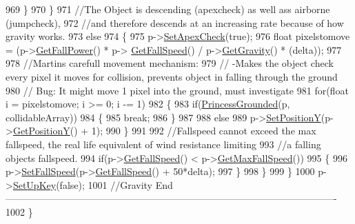 \begin{DoxyCode}
969             \}
970         \}
971             \textcolor{comment}{//The Object is descending (apexcheck) as well ass airborne (jumpcheck),}
972             \textcolor{comment}{//and therefore descends at an increasing rate because of how gravity works.}
973         \textcolor{keywordflow}{else}
974         \{
975             p->\hyperlink{classPrincessObject_a269f54cc9474075c1af91546f00f7779}{SetApexCheck}(\textcolor{keyword}{true});
976             \textcolor{keywordtype}{float} pixelstomove = (p->\hyperlink{classPrincessObject_a05416932be4e45a50400526bc75ff229}{GetFallPower}() * p->
      \hyperlink{classPrincessObject_aba411af16e874c2c738e101cf11f9e0c}{GetFallSpeed}() / p->\hyperlink{classPrincessObject_a341bb1d246698092d1dd2138dc0a0a9e}{GetGravity}() * (delta));
977 
978             \textcolor{comment}{//Martins carefull movement mechanism:}
979             \textcolor{comment}{//  -Makes the object check every pixel it moves for collision, prevents object in falling
       through the ground}
980             \textcolor{comment}{//  Bug: It might move 1 pixel into the ground, must investigate}
981             \textcolor{keywordflow}{for}(\textcolor{keywordtype}{float} i = pixelstomove; i >= 0; i -= 1)
982             \{
983                 \textcolor{keywordflow}{if}(\hyperlink{classPhysics_a081cbec413244f80e8937da3ef751c70}{PrincessGrounded}(p, collidableArray))
984                 \{
985                     \textcolor{keywordflow}{break};
986                 \}
987 
988                 \textcolor{keywordflow}{else}
989                     p->\hyperlink{classPrincessObject_a1b920b29beffdc9f5c776deea5a35c4d}{SetPositionY}(p->\hyperlink{classPrincessObject_ab467215d25ae8ea54e55888fc78222db}{GetPositionY}() + 1);
990             \}
991 
992             \textcolor{comment}{//Fallspeed cannot exceed the max fallspeed, the real life equivalent of wind resistance
       limiting}
993             \textcolor{comment}{//a falling objects fallspeed.}
994             \textcolor{keywordflow}{if}(p->\hyperlink{classPrincessObject_aba411af16e874c2c738e101cf11f9e0c}{GetFallSpeed}() < p->\hyperlink{classPrincessObject_a64acccc1494d3f5ed3050d1c1e07c169}{GetMaxFallSpeed}())
995             \{
996                 p->\hyperlink{classPrincessObject_abd96d1e4fed044c8e1a0f99c6b4820d4}{SetFallSpeed}(p->\hyperlink{classPrincessObject_aba411af16e874c2c738e101cf11f9e0c}{GetFallSpeed}() + 50*delta);
997             \}
998         \}
999     \}
1000     p->\hyperlink{classPrincessObject_a68daadc8a6eba6e4c79f15816235d2f3}{SetUpKey}(\textcolor{keyword}{false});
1001     \textcolor{comment}{//Gravity
       End-------------------------------------------------------------------------------------------------------}
1002 \}
\end{DoxyCode}
